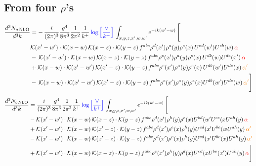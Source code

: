 \documentclass[9pt]{article}
\numberwithin{equation}{section}
\begin{document}
\subsection{From four $\rho$'s}
\begin{align}
    \frac{d^{3}N_{a\,\rm NLO}}{d^{3}k} & = -\,\frac{i}{(2\pi)^{3}}\frac{g^{4}}{8\pi^{3}}\frac{1}{2\pi^{2}} \frac{1}{k^{+}}\,{\color{blue}\log{\left[\frac{\vee}{k^{+}}\right]}}\,\int_{x,y,z,x^{\prime},w,w^{\prime}}e^{-ik(w^{\prime}-w)}\, \Bigg[\notag \\ &  \mathcal{K}(x'-w')\cdot \mathcal{K}(x-w)\, \mathcal{K}(x-z)\cdot \mathcal{K}(y-z)\, f^{a b c} \rho^{d}(x') \rho^{a}(y) \rho^{c}(x)\,U^{ed}(w') U^{e b}(w)\,  {\color{red}\alpha} \nonumber\\
    &  -\,\mathcal{K}(x'-w')\cdot \mathcal{K}(x-w)\, \mathcal{K}(x-z)\cdot \mathcal{K}(y-z)\, f^{a b c} \rho^{e}(x') \rho^{a}(y) \rho^{c}(x)\, U^{d b}(w) U^{de}(x')\, {\color{red}\alpha} \nonumber\\
    & + \mathcal{K}(x-w)\cdot \mathcal{K}(x'-w')\, \mathcal{K}(x'-z)\cdot \mathcal{K}(y-z)\, f^{a b c} \rho^{c}(x') \rho^{a}(y) \rho^{e}(x)\,U^{d b}(w') U^{de}(x)\, {\color{orange} \alpha'} \nonumber\\
    & -\,\mathcal{K}(x-w)\cdot \mathcal{K}(x'-w')\, \mathcal{K}(x'-z)\cdot \mathcal{K}(y-z)\, f^{a b c} \rho^{c}(x') \rho^{a}(y) \rho^{e}(x) U^{db}(w') U^{de}(w)\, {\color{orange} \alpha'}\Bigg]
\end{align}
\begin{align}
      \frac{d^{3}N_{b\,\rm NLO}}{d^{3}k} & = \frac{i}{(2\pi)^{3}}\frac{g^{4}}{8\pi^{3}}\frac{1}{2\pi^{2}} \frac{1}{k^{+}}\,{\color{blue}\log{\left[\frac{\vee}{k^{+}}\right]}}\,\int_{x,y,z,x^{\prime},w,w^{\prime}}e^{-ik(w^{\prime}-w)}\, \Bigg[\notag \\ & - \mathcal{K}(x'-w')\cdot \mathcal{K}(x-w)\, \mathcal{K}(x-z)\cdot \mathcal{K}(y-z)\, f^{a b c} \rho^{d}(x') \rho^{h}(y) \rho^{e}(x) U^{bd}(w' U^{ce}(x U^{a h}(y)\,{\color{red}\alpha} \nonumber\\
    &+ \mathcal{K}(x'-w')\cdot \mathcal{K}(x-w)\,\mathcal{K}(x'-z)\cdot \mathcal{K}(y-z)\, f^{a b c} \rho^{d}(x') \rho^{e}(x) \rho^{h}(y) U^{cd}(x' U^{be}(w U^{a h}(y)\, {\color{orange} \alpha'}\nonumber\\
    &- \mathcal{K}(x'-w')\cdot \mathcal{K}(x-w)\,\mathcal{K}(x'-z)\cdot \mathcal{K}(y-z)\, f^{a b c} \rho^{d}(x') \rho^{e}(x) \rho^{h}(y) U^{cd}(x' U^{b e}(x) U^{a h}(y)\, {\color{orange} \alpha'}\nonumber\\
    &+  \mathcal{K}(x'-w')\cdot \mathcal{K}(x-w)\, \mathcal{K}(x-z)\cdot \mathcal{K}(y-z)\, f^{a b c} \rho^{e}(x') \rho^{h}(y) \rho^{d}(x) U^{cd}(x U^{b e}(x') U^{a h}(y)\, {\color{red}\alpha}\Bigg]
\end{align}
\end{document}
